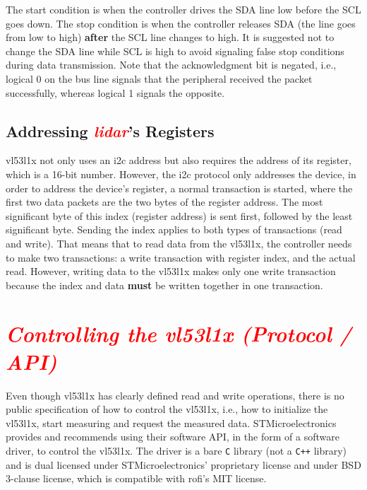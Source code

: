 \documentclass[
  digital,     %
  oneside,     %
  nosansbold,  %
  nocolorbold, %
  nolof,         %
  nolot,         %
]{fithesis4}
\newcommand{\TODO}[1]{\textcolor{red}{\textit{#1}}}
\newcommand{\TODOLIST}[1]{}
\begin{document}
{{{The start condition is when the controller drives the SDA line low before the SCL goes down. The stop condition is when the controller releases SDA (the line goes from low to high) \textbf{after} the SCL line changes to high. It is suggested not to change the SDA line while SCL is high to avoid signaling false stop conditions during data transmission. Note that the acknowledgment bit is negated, i.e., logical 0 on the bus line signals that the peripheral received the packet successfully, whereas logical 1 signals the opposite.


\subsection[ Addressing LiDAR's Registers ]{ Addressing \TODO{\acrshort{lidar}}'s Registers } \label{sec:lidar-i2c} 
\gls{vl53l1x} not only uses an \acrshort{i2c} address but also requires the address of its register, which is a 16-bit number. However, the \acrshort{i2c} protocol only addresses the device, in order to address the device's register, a normal transaction is started, where the first two data packets are the two bytes of the register address. The most significant byte of this index (register address) is sent first, followed by the least significant byte. Sending the index applies to both types of transactions (read and write). That means that to read data from the \gls{vl53l1x}, the controller needs to make two transactions: a write transaction with register index, and the actual read. However, writing data to the \gls{vl53l1x} makes only one write transaction because the index and data \textbf{must} be written together in one transaction.



\section[ Controlling the VL53L1X ]{ \TODO{ Controlling the \gls{vl53l1x} (Protocol / API)} }
Even though \gls{vl53l1x} has clearly defined read and write operations, there is no public specification of how to control the \gls{vl53l1x}, i.e., how to initialize the \gls{vl53l1x}, start measuring and request the measured data. STMicroelectronics provides and recommends using their software API, in the form of a software driver, to control the \gls{vl53l1x}. The driver is a bare \verb|C| library (not a \verb|C++| library) and is dual licensed under STMicroelectronics' proprietary license and under BSD 3-clause license, which is compatible with \acrshort{rofi}'s MIT license.

}}}
\end{document}
